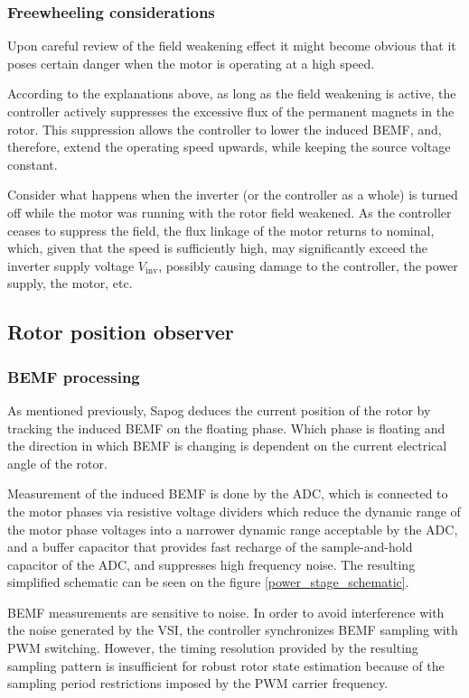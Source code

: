 \documentclass{zubaxdoc}
\begin{document}
\subsubsection{Freewheeling considerations}

Upon careful review of the field weakening effect it might become obvious that it poses certain danger
when the motor is operating at a high speed.

According to the explanations above, as long as the field weakening is active,
the controller actively suppresses the excessive flux of the permanent magnets in the rotor.
This suppression allows the controller to lower the induced BEMF, and, therefore,
extend the operating speed upwards, while keeping the source voltage constant.

Consider what happens when the inverter (or the controller as a whole) is turned off while the
motor was running with the rotor field weakened.
As the controller ceases to suppress the field, the flux linkage of the motor returns to nominal,
which, given that the speed is sufficiently high, may significantly exceed the inverter supply
voltage $V_\text{inv}$, possibly causing damage to the controller, the power supply, the motor, etc.

\subsection{Rotor position observer}

\subsubsection{BEMF processing}

As mentioned previously, Sapog deduces the current position of the rotor by tracking the induced BEMF
on the floating phase.
Which phase is floating and the direction in which BEMF is changing is dependent on the current electrical
angle of the rotor.

Measurement of the induced BEMF is done by the ADC, which is connected to the motor phases via
resistive voltage dividers which reduce the dynamic range of the motor phase voltages into a narrower
dynamic range acceptable by the ADC,
and a buffer capacitor that provides fast recharge of the sample-and-hold capacitor of the ADC,
and suppresses high frequency noise.
The resulting simplified schematic can be seen on the figure \ref{power_stage_schematic}.

BEMF measurements are sensitive to noise. In order to avoid interference with the noise generated
by the VSI, the controller synchronizes BEMF sampling with PWM switching.
However, the timing resolution provided by the resulting sampling pattern is insufficient for robust
rotor state estimation because of the sampling period restrictions imposed by the
PWM carrier frequency.
\end{document}
